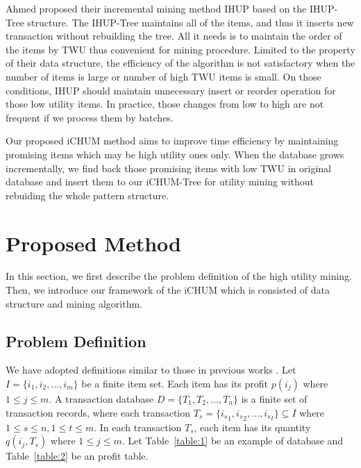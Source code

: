 \documentclass[runningheads,a4paper]{llncs}
\begin{document}
Ahmed \cite{Ahmed:IHUP} proposed their incremental mining method IHUP based on the IHUP-Tree structure. The IHUP-Tree maintains all of the items, and thus it inserts new transaction without rebuilding the tree. All it needs is to maintain the order of the items by TWU thus convenient for mining procedure. Limited to the property of their data structure, the efficiency of the algorithm is not satisfactory when the number of items is large or number of high TWU items is small. On those conditions, IHUP should maintain unnecessary insert or reorder operation for those low utility items. In practice, those changes from low to high are not frequent if we process them by batches.

Our proposed iCHUM method aims to improve time efficiency by maintaining promising items which may be high utility ones only. When the database grows incrementally, we find back those promising items with low TWU in original database and insert them to our iCHUM-Tree for utility mining without rebuiding the whole pattern structure.

\section{Proposed Method}
In this section, we first describe the problem definition of the high utility mining. Then, we introduce our framework of the iCHUM which is consisted of data structure and mining algorithm.

\subsection{Problem Definition}
We have adopted definitions similar to those in previous works \cite{Ahmed:IHUP,Liu:two-phasewithCCPD,Tseng:up-growth}. Let $ I = \{i_{1},i_{2},\ldots,i_{m}\} $ be a finite item set. Each item has its profit $p(i_{j})$ where $ 1{\leqslant}j{\leqslant}m$. A transaction database $ D = \{T_{1},T_{2},\ldots,T_{n}\} $ is a finite set of transaction records, where each transaction $ T_{s} = \{ {i_{s}}_{1},{i_{s}}_{2},\ldots,{i_{s}}_{t} \} \subseteq I$ where $1{\leqslant}s{\leqslant}n, 1{\leqslant}t{\leqslant}m$. In each transaction $ T_{s} $, each item has its quantity $ q(i_{j},T_{s}) $ where $ 1{\leqslant}j{\leqslant}m$. Let Table~\ref{table:1} be an example of database and Table~\ref{table:2} be an profit table.
\end{document}
